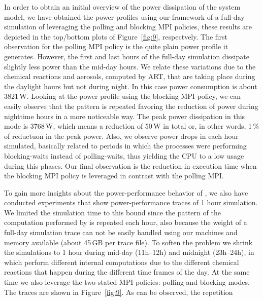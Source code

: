 
In order to obtain an initial overview of the power dissipation of the system model, we have 
obtained the power profiles using our \pmlib framework of a full-day simulation of \cosmoart 
leveraging the polling and blocking MPI policies, these results are depicted in the top/bottom 
plots of Figure~\ref{fig:9}, respectvely. The first observation for 
the polling MPI policy is the quite plain power profile it generates. However, the first and 
last hours of the full-day simulation dissipate slightly less power than the mid-day hours. We 
relate these variations due to the chemical reactions and aerosols, computed by ART, that are 
taking place during the daylight hours but not during night. In this case power consumption
 is about 3821\,W. Looking at the power profile using the blocking MPI policy, we 
can easily observe that the pattern is repeated favoring the reduction of power during 
nighttime hours in a more  noticeable way. The peak power dissipation in this mode is 3768\,W, 
which means a reduction of 50\,W in total or, in other words, 1\,\% of reductuon in the peak 
power. Also, we observe power  drops in each hour simulated, basically related to periods in 
which the processes were performing blocking-waits instead of polling-waits, thus yielding the 
CPU to a low usage during this phases. Our final observation is the reduction in execution time 
when the blocking MPI policy is leveraged in contrast with the polling MPI.

To gain more insights about the power-performance behavior of \cosmoart, we also have conducted 
experiments that show power-performance traces of 1 hour simulation. We limited the simulation 
time to this bound since the pattern of the computation performed by \cosmoart is repeated each 
hour, also because the weight of a full-day simulation trace can not be easily handled using 
our machines and memory available (about 45\,GB per trace file). To soften the problem we 
shrink the simulations to 1 hour during mid-day (11h--12h) and midnight (23h--24h), in which 
\cosmoart perform different internal computations due to the different chemical reactions that happen during the different time frames of the day. At the same time we also leverage the two stated MPI policies: polling and blocking modes. The traces are shown in Figure~\ref{fig:9}.
As can be observed, the repetition

